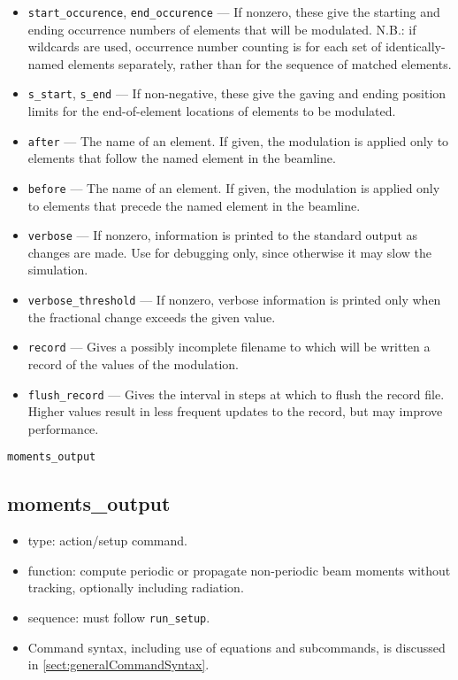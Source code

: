 \documentclass[11pt]{article}
\begin{document}
\begin{itemize}
\item \verb|start_occurence|, \verb|end_occurence| --- If nonzero, these give the starting and
 ending occurrence numbers of elements that will be modulated. N.B.: if wildcards are used, occurrence
 number counting is for each set of identically-named elements separately, rather than for the sequence
 of matched elements.
\item \verb|s_start|, \verb|s_end| --- If non-negative, these give the gaving and ending position
 limits for the end-of-element locations of elements to be modulated.
\item \verb|after| --- The name of an element.  If given, the modulation is applied only to elements
 that follow the named element in the beamline.  
\item \verb|before| --- The name of an element.  If given, the modulation is applied only to elements
 that precede the named element in the beamline. 
\item \verb|verbose| --- If nonzero, information is printed to the standard output as changes are
        made.  Use for debugging only, since otherwise it may slow the simulation.
\item \verb|verbose_threshold| --- If nonzero, verbose information is printed only when the fractional change
   exceeds the given value.
\item \verb|record| --- Gives a possibly incomplete filename to which will be written a record of the values of
  the modulation.
\item \verb|flush_record| --- Gives the interval in steps at which to flush the record file. Higher values result
 in less frequent  updates to the record, but may improve performance.
\end{itemize}

\newpage
\begin{center}{\Large\verb|moments_output|}\end{center}
\subsection{moments\_output \label{subsec:momentsoutput}}

\begin{itemize}
\item type: action/setup command.
\item function: compute periodic or propagate non-periodic beam moments without tracking, optionally including radiation.
\item sequence: must follow \verb|run_setup|.
\item Command syntax, including use of equations and subcommands, is discussed in \ref{sect:generalCommandSyntax}.
\end{itemize}
\end{document}
